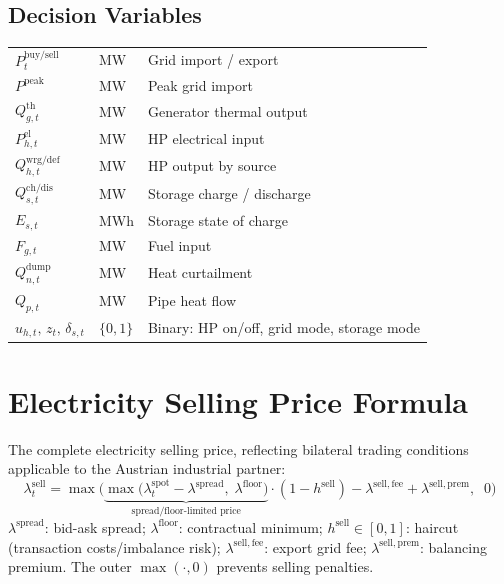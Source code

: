 \documentclass[review,3p]{elsarticle}
\begin{document}
\subsection*{Decision Variables}
\begin{tabular}{@{}p{2.8cm}p{2.0cm}p{7.5cm}@{}}
$P_t^{\mathrm{buy/sell}}$         & MW        & Grid import / export \\
$P^{\mathrm{peak}}$               & MW        & Peak grid import \\
$Q_{g,t}^{\mathrm{th}}$          & MW        & Generator thermal output \\
$P_{h,t}^{\mathrm{el}}$          & MW        & HP electrical input \\
$Q_{h,t}^{\mathrm{wrg/def}}$     & MW        & HP output by source \\
$Q_{s,t}^{\mathrm{ch/dis}}$      & MW        & Storage charge / discharge \\
$E_{s,t}$                        & MWh       & Storage state of charge \\
$F_{g,t}$                        & MW        & Fuel input \\
$Q_{n,t}^{\mathrm{dump}}$        & MW        & Heat curtailment \\
$Q_{p,t}$                        & MW        & Pipe heat flow \\
$u_{h,t},\, z_t,\, \delta_{s,t}$ & $\{0,1\}$ & Binary: HP on/off, grid mode, storage mode \\
\end{tabular}

\section{Electricity Selling Price Formula}
\label{app:selling_price}

The complete electricity selling price, reflecting bilateral trading
conditions applicable to the Austrian industrial partner:
\begin{equation}
\lambda_t^{\mathrm{sell}} = \max\!\Bigg(\!
\underbrace{
\max\!\big(\lambda_t^{\mathrm{spot}} - \lambda^{\mathrm{spread}},\;
\lambda^{\mathrm{floor}}\big)
}_{\text{spread/floor-limited price}}
\cdot (1 - h^{\mathrm{sell}})
- \lambda^{\mathrm{sell,fee}} + \lambda^{\mathrm{sell,prem}},
\;\; 0\Bigg)
\end{equation}
$\lambda^{\mathrm{spread}}$: bid-ask spread;
$\lambda^{\mathrm{floor}}$: contractual minimum;
$h^{\mathrm{sell}} \in [0,1]$: haircut (transaction costs/imbalance
risk); $\lambda^{\mathrm{sell,fee}}$: export grid fee;
$\lambda^{\mathrm{sell,prem}}$: balancing premium. The outer
$\max(\cdot, 0)$ prevents selling penalties.
\end{document}
